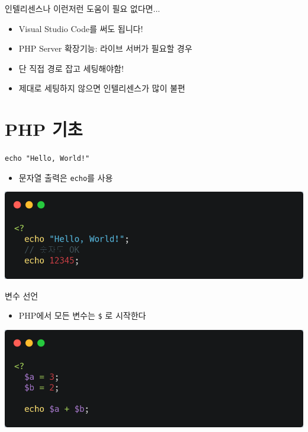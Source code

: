 \documentclass{beamer}
\begin{document}
    \begin{frame}{인텔리센스나 이런저런 도움이 필요 없다면...}
        \begin{itemize}
            \item Visual Studio Code를 써도 됩니다!
            \item PHP Server 확장기능: 라이브 서버가 필요할 경우
            \item 단 직접 경로 잡고 세팅해야함!
            \item 제대로 세팅하지 않으면 인텔리센스가 많이 불편
        \end{itemize}
    \end{frame}

\section{PHP 기초}
    \begin{frame}{\texttt{echo "Hello, World!"}}
        \begin{itemize}
            \item 문자열 출력은 \texttt{echo}를 사용
        \end{itemize}
        \begin{center}
            \includegraphics[width=\textwidth]{Images/php1.png}
        \end{center}
    \end{frame}

    \begin{frame}{변수 선언}
        \begin{itemize}
            \item PHP에서 모든 변수는 \texttt{\$} 로 시작한다
        \end{itemize}
        \begin{center}
            \includegraphics[width=\textwidth]{Images/php2.png}
        \end{center}
    \end{frame}
\end{document}
